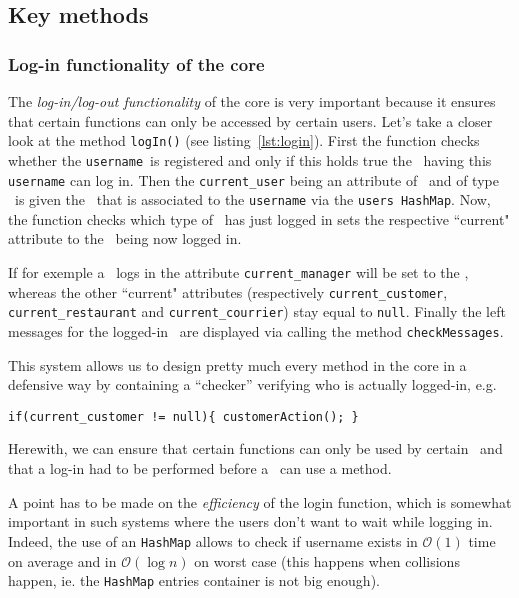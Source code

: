 \subsection{Key methods} %
\label{sub:key_methods}


\subsubsection{Log-in functionality of the core} %
\label{ssub:log_in_functionality_of_the_core}

The \emph{log-in/log-out functionality} of the core is very important because it ensures 
that certain functions can only be accessed by certain users.
Let's take a closer look at the method \lstinline|logIn()| (see listing~\ref{lst:login}).
First the function checks whether the \lstinline|username|~is
registered and only if this holds true the \User~having this \lstinline|username| can log in.
Then the \lstinline|current_user| being an attribute of \Core~and
of type \User~is given the \User~that is associated to the \lstinline|username|
via the \lstinline|users HashMap|.
Now, the function checks which type of \User~has just logged in sets 
the respective ``current" attribute to the \User~being now logged in.

If for exemple a \Manager~logs in the attribute \lstinline|current_manager| will
be set to the \User, whereas the other ``current" attributes (respectively
\lstinline|current_customer|, \lstinline|current_restaurant|
and \lstinline|current_courrier|) stay equal to \lstinline|null|.
Finally the left messages for the logged-in \User~are displayed
via calling the method \lstinline|checkMessages|.

This system allows us to design pretty much every method in the core in a defensive way 
by containing a ``checker'' verifying who is actually logged-in, e.g.
\begin{center}
  \lstinline|if(current_customer != null){ customerAction(); }|
\end{center}
Herewith, we can ensure that certain functions can only be used 
by certain \User~and that a log-in had to be performed before a \User~can use a method.

A point has to be made on the \emph{efficiency} of the login function, which
is somewhat important in such systems where the users don't want to wait
while logging in.
Indeed, the use of an \lstinline|HashMap| allows to check if username exists
in $\mathcal{O}(1)$ time on average and in $\mathcal{O}(\log{n})$ on worst case
(this happens when collisions happen, ie. the \lstinline|HashMap|
entries container is not big enough)\cite{hashMap}.

